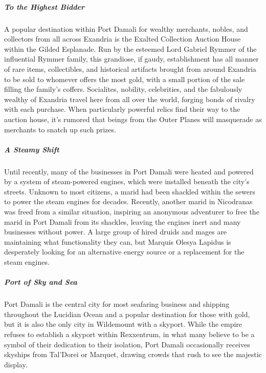 \documentclass[10pt,a4paper,twoside,bg=print,twocolumn,openany,nodeprecatedcode]{dndbook}
\begin{document}
\subparagraph{To the Highest Bidder}
A popular destination within Port Damali for wealthy merchants, nobles, and collectors from all across Exandria is the Exalted Collection Auction House within the Gilded Esplanade. Run by the esteemed Lord Gabriel Rymmer of the influential Rymmer family, this grandiose, if gaudy, establishment has all manner of rare items, collectibles, and historical artifacts brought from around Exandria to be sold to whomever offers the most gold, with a small portion of the sale filling the family's coffers. Socialites, nobility, celebrities, and the fabulously wealthy of Exandria travel here from all over the world, forging bonds of rivalry with each purchase. When particularly powerful relics find their way to the auction house, it's rumored that beings from the Outer Planes will masquerade as merchants to snatch up such prizes.

\subparagraph{A Steamy Shift}
Until recently, many of the businesses in Port Damali were heated and powered by a system of steam-powered engines, which were installed beneath the city's streets. Unknown to most citizens, a marid had been shackled within the sewers to power the steam engines for decades. Recently, another marid in Nicodranas was freed from a similar situation, inspiring an anonymous adventurer to free the marid in Port Damali from its shackles, leaving the engines inert and many businesses without power. A large group of hired druids and mages are maintaining what functionality they can, but Marquis Olesya Lapidus is desperately looking for an alternative energy source or a replacement for the steam engines.

\subparagraph{Port of Sky and Sea}
Port Damali is the central city for most seafaring business and shipping throughout the Lucidian Ocean and a popular destination for those with gold, but it is also the only city in Wildemount with a skyport. While the empire refuses to establish a skyport within Rexxentrum, in what many believe to be a symbol of their dedication to their isolation, Port Damali occasionally receives skyships from Tal'Dorei or Marquet, drawing crowds that rush to see the majestic display.
\end{document}
